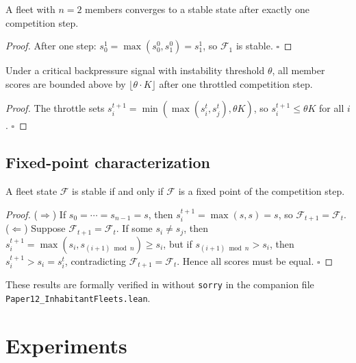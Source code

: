 \documentclass[11pt]{article}
\providecommand{\Fleet}{\mathcal{F}}               %
\begin{document}
\begin{corollary}\label{cor:two-member}
A fleet with $n = 2$ members converges to a stable state after exactly one
competition step.
\end{corollary}
\begin{proof}
After one step: $s_0^1 = \max(s_0^0, s_1^0) = s_1^1$, so $\Fleet_1$ is stable.
\hfill$\square$
\end{proof}

\begin{corollary}\label{cor:bp-bounds}
Under a critical backpressure signal with instability threshold $\theta$,
all member scores are bounded above by $\lfloor \theta \cdot K \rfloor$ after
one throttled competition step.
\end{corollary}
\begin{proof}
The throttle sets $s_i^{t+1} = \min(\max(s_i^t, s_j^t), \theta K)$, so
$s_i^{t+1} \leq \theta K$ for all $i$. \hfill$\square$
\end{proof}

\subsection{Fixed-point characterization}

\begin{theorem}\label{thm:fixed-point}
A fleet state $\Fleet$ is stable if and only if $\Fleet$ is a fixed point
of the competition step.
\end{theorem}
\begin{proof}
($\Rightarrow$) If $s_0 = \cdots = s_{n-1} = s$, then
$s_i^{t+1} = \max(s, s) = s$, so $\Fleet_{t+1} = \Fleet_t$.
($\Leftarrow$) Suppose $\Fleet_{t+1} = \Fleet_t$.  If some $s_i \neq s_j$,
then $s_i^{t+1} = \max(s_i, s_{(i+1)\bmod n}) \geq s_i$, but if
$s_{(i+1)\bmod n} > s_i$, then $s_i^{t+1} > s_i = s_i^t$, contradicting
$\Fleet_{t+1} = \Fleet_t$.  Hence all scores must be equal. \hfill$\square$
\end{proof}

\noindent
These results are formally verified in \LEAN{} without \texttt{sorry} in
the companion file \texttt{Paper12\_InhabitantFleets.lean}.

\section{Experiments}\label{sec:experiments}
\end{document}
